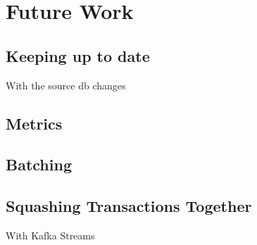 \chapter{Future Work}
\label{ch:future}


\section{Keeping up to date}
With the source db changes

\section{Metrics}

\section{Batching}
\label{sec:batching}

\section{Squashing Transactions Together}
\label{sec:squashing-transactions}

With Kafka Streams
